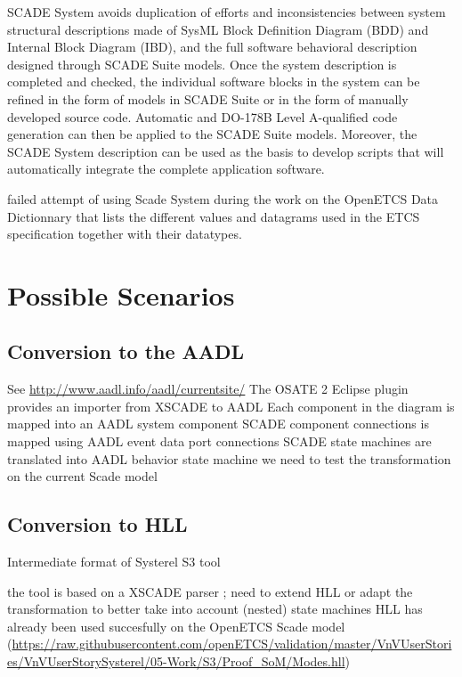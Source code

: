 \documentclass{template/openetcs_report}
\begin{document}
SCADE System avoids duplication of efforts and inconsistencies between
system structural descriptions made of SysML Block Definition Diagram
(BDD) and Internal Block Diagram (IBD), and the full software
behavioral description designed through SCADE Suite models. Once the
system description is completed and checked, the individual software
blocks in the system can be refined in the form of models in SCADE
Suite or in the form of manually developed source code. Automatic and
DO-178B Level A-qualified code generation can then be applied to the
SCADE Suite models. Moreover, the SCADE System description can be used
as the basis to develop scripts that will automatically integrate the
complete application software.


failed attempt of using Scade System during the work on the OpenETCS
Data Dictionnary that lists the different values and datagrams used in
the ETCS specification together with their datatypes.



\chapter{Possible Scenarios}
\label{cha:possible-scenarios}

\section{Conversion to the AADL}

See \url{http://www.aadl.info/aadl/currentsite/}
The OSATE 2 Eclipse plugin provides an importer from XSCADE to AADL
Each component in the diagram is mapped into an AADL system component
SCADE component connections is mapped using AADL event data port connections
SCADE state machines are translated into AADL behavior state machine
we need to test the transformation on the current Scade model

\section{Conversion to HLL}

Intermediate format of Systerel S3 tool

the tool is based on a XSCADE parser ; need to extend HLL or adapt the
transformation to better take into account (nested) state machines HLL
has already been used succesfully on the OpenETCS Scade model
(\url{https://raw.githubusercontent.com/openETCS/validation/master/VnVUserStories/VnVUserStorySysterel/05-Work/S3/Proof_SoM/Modes.hll})
\end{document}

